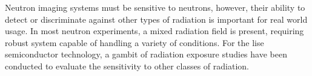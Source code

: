 \documentclass[../../../main.tex]{subfiles}%
\begin{document}
%
    \Xsubsection%
    Neutron imaging systems must be sensitive to neutrons, however, their ability to detect or discriminate against other types of radiation is important for real world usage.
    In most neutron experiments, a mixed radiation field is present, requiring robust system capable of handling a variety of conditions.
    For the \gls{lise} semiconductor technology, a gambit of radiation exposure studies have been conducted to evaluate the sensitivity to other classes of radiation.
\end{document}
